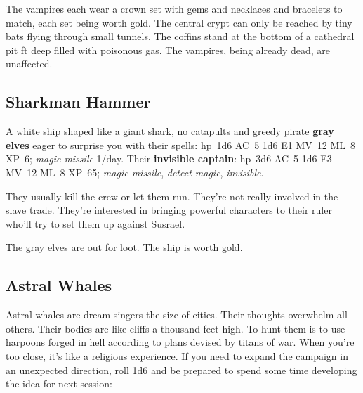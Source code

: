 \documentclass[11pt]{bxart}
\begin{document}
The vampires each wear a crown set with gems and necklaces and
bracelets to match, each set being worth \unit[10,000]{gold}. The
central crypt can only be reached by tiny bats flying through small
tunnels. The coffins stand at the bottom of a cathedral pit
\unit[100]{ft} deep filled with poisonous gas. The vampires, being
already dead, are unaffected.

\subsection{Sharkman Hammer}

A white ship shaped like a giant shark, no catapults and 
greedy pirate \textbf{gray elves} eager to surprise you with their
spells: hp~1d6 AC~5 1d6 E1 MV~12 ML~8 XP~6; \emph{magic missile}
1/day. Their \textbf{invisible captain}: hp~3d6 AC~5 1d6 E3 MV~12 ML~8
XP~65; \emph{magic missile}, \emph{detect magic}, \emph{invisible}.

They usually kill the crew or let them run. They're not really
involved in the slave trade. They're interested in bringing powerful
characters to their ruler who'll try to set them up against Susrael.

The gray elves are out for loot. The ship is worth
\unit[20,000]{gold}.

\subsection{Astral Whales}

Astral whales are dream singers the size of cities. Their thoughts
overwhelm all others. Their bodies are like cliffs a thousand feet
high. To hunt them is to use harpoons forged in hell according to
plans devised by titans of war. When you're too close, it's like a
religious experience. If you need to expand the campaign in an
unexpected direction, roll 1d6 and be prepared to spend some time
developing the idea for next session:
\end{document}
